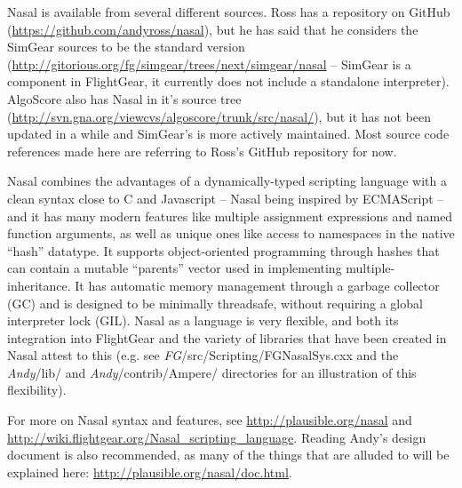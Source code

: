 \documentclass{article}
\newcommand{\todo}[1]{}
\newcommand{\comment}[1]{}%
\newcommand{\src}[1]{\textcolor{source}{\it #1}}
\begin{document}
Nasal is available from several different sources.  Ross has a repository on GitHub (\url{https://github.com/andyross/nasal}), but he has said that he considers the SimGear sources to be the standard version (\url{http://gitorious.org/fg/simgear/trees/next/simgear/nasal} -- SimGear is a component in FlightGear, it currently does not include a standalone interpreter).  AlgoScore also has Nasal in it's source tree (\url{http://svn.gna.org/viewcvs/algoscore/trunk/src/nasal/}), but it has not been updated in a while and SimGear's is more actively maintained.  Most source code references made here are referring to Ross's GitHub repository for now.\todo{We should start moving to simgear/gitorious references...}

\comment{the patched interpreter we're using uses yet another repo, the "nasal-standalone" repository on gitorious, which is merged from Andy's and SimGear's Nasal interpreter and uses CMake instead of Autotools}

Nasal combines the advantages of a dynamically-typed scripting language with a clean syntax close to C and Javascript -- Nasal being inspired by ECMAScript -- and it has many modern features like multiple assignment expressions and named function arguments, as well as unique ones like access to namespaces in the native ``hash'' datatype.  It supports object-oriented programming through hashes that can contain a mutable ``parents'' vector used in implementing multiple-inheritance.  It has automatic memory management through a garbage collector (GC) and is designed to be minimally threadsafe, without requiring a global interpreter lock (GIL).  Nasal as a language is very flexible, and both its integration into FlightGear and the variety of libraries that have been created in Nasal attest to this (e.g. see \src{FG}/src/Scripting/FGNasalSys.cxx and the \src{Andy}/lib/ and \src{Andy}/contrib/Ampere/ directories for an illustration of this flexibility).

For more on Nasal syntax and features, see \url{http://plausible.org/nasal} and \url{http://wiki.flightgear.org/Nasal_scripting_language}.  Reading Andy's design document is also recommended, as many of the things that are alluded to will be explained here: \url{http://plausible.org/nasal/doc.html}.

\comment{
\todo{we should get in touch with Andy to get the github repository updated, and to get the cmake changes upstream}
\section{Getting, building and installing Nasal}
\subsection{Windows}
\subsection{Mac}
\subsection{Unix/Linux}
}
\end{document}
